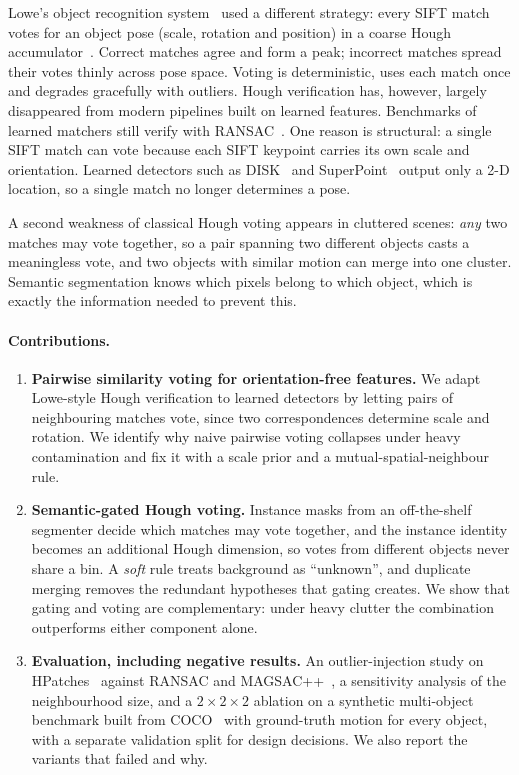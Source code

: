 \documentclass{article}
\begin{document}
Lowe's object recognition system~\cite{lowe2004sift} used a different
strategy: every SIFT match votes for an object pose (scale, rotation and
position) in a coarse Hough accumulator~\cite{duda1972hough,ballard1981ght}.
Correct matches agree and form a peak; incorrect matches spread their votes
thinly across pose space. Voting is deterministic, uses each match once and
degrades gracefully with outliers. Hough verification has, however, largely
disappeared from modern pipelines built on learned features. Benchmarks of
learned matchers still verify with RANSAC~\cite{yu2024gvbench}. One reason is
structural: a single SIFT match can vote because each SIFT keypoint carries
its own scale and orientation. Learned detectors such as
DISK~\cite{tyszkiewicz2020disk} and SuperPoint~\cite{detone2018superpoint}
output only a 2-D location, so a single match no longer determines a pose.

A second weakness of classical Hough voting appears in cluttered scenes:
\emph{any} two matches may vote together, so a pair spanning two different
objects casts a meaningless vote, and two objects with similar motion can
merge into one cluster. Semantic segmentation knows which pixels belong to
which object, which is exactly the information needed to prevent this.

\paragraph{Contributions.}
\begin{enumerate}
  \item \textbf{Pairwise similarity voting for orientation-free features.} We
  adapt Lowe-style Hough verification to learned detectors by letting pairs of
  neighbouring matches vote, since two correspondences determine scale and
  rotation. We identify why naive pairwise voting collapses under heavy
  contamination and fix it with a scale prior and a mutual-spatial-neighbour
  rule.
  \item \textbf{Semantic-gated Hough voting.} Instance masks from an
  off-the-shelf segmenter decide which matches may vote together, and the
  instance identity becomes an additional Hough dimension, so votes from
  different objects never share a bin. A \emph{soft} rule treats background
  as ``unknown'', and duplicate merging removes the redundant hypotheses that
  gating creates. We show that gating and voting are complementary: under heavy
  clutter the combination outperforms either component alone.
  \item \textbf{Evaluation, including negative results.} An outlier-injection
  study on HPatches~\cite{balntas2017hpatches} against RANSAC and
  MAGSAC++~\cite{barath2020magsacpp}, a sensitivity analysis of the
  neighbourhood size, and a $2\times2\times2$ ablation on a synthetic
  multi-object benchmark built from COCO~\cite{lin2014coco} with ground-truth
  motion for every object, with a separate validation split for design
  decisions. We also report the variants that failed and why.
\end{enumerate}
\end{document}
